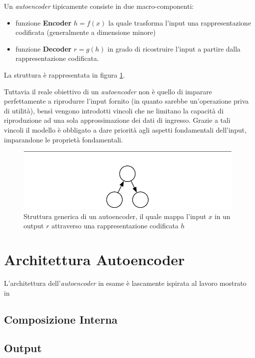 Un \textit{autoencoder} tipicamente consiste in due macro-componenti:
\begin{itemize}
\item funzione \textbf{Encoder} $h = f(x)$ la quale trasforma l'input una rappresentazione codificata (generalmente a dimensione minore)
\item funzione \textbf{Decoder} $r = g(h)$ in grado di ricostruire l'input a partire dalla rappresentazione codificata. 
\end{itemize}
La struttura è rappresentata in figura \ref{fig:autoencoder1}. 

Tuttavia il reale obiettivo di un \textit{autoencoder }non è quello di imparare perfettamente a riprodurre l'input fornito (in quanto sarebbe un'operazione priva di utilità), bensì vengono introdotti vincoli che ne limitano la capacità di riproduzione ad una sola approssimazione dei dati di ingresso. Grazie a tali vincoli il modello è obbligato a dare priorità agli aspetti fondamentali dell'input, imparandone le proprietà fondamentali.

\begin{figure}[htb]
    \centering
    \includegraphics[width=.4\columnwidth]{figures/autoencoder1.png}
    \caption{Struttura generica di un autoencoder, il quale mappa l'input $x$ in un output $r$ attraverso una rappresentazione codificata $h$}
\label{fig:autoencoder1}
\end{figure}

\section{Architettura Autoencoder}
\label{autoencoder}
L'architettura dell'\textit{autoencoder} in esame è lascamente ispirata al lavoro mostrato in \cite{1508.06615}



\subsection{Composizione Interna}
\label{advinterno}

\subsection{Output}
\label{advoutput}

